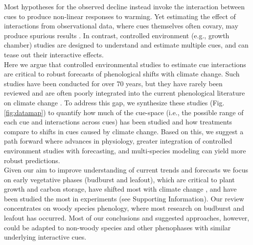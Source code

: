 \documentclass[11pt,letter]{article}
\begin{document}
Most hypotheses for the observed decline instead invoke the interaction between cues to produce non-linear responses to warming. Yet estimating the effect of interactions from observational data, where cues themselves often covary, may produce spurious results \citep{ettinger2020}. In contrast, controlled environment (e.g., growth chamber) studies are designed to understand and estimate multiple cues, and can tease out their interactive effects. \\ %

Here we argue that controlled environmental studies to estimate cue interactions are critical to robust forecasts of phenological shifts with climate change. Such studies have been conducted for over 70 years, but they have rarely been reviewed and are often poorly integrated into the current phenological literature on climate change \citep[e.g.,][]{fu2015,richardson2018}. To address this gap, we synthesize these studies (Fig. \ref{fig:datamap}) to quantify how much of the cue-space (i.e., the possible range of each cue and interactions across cues) has been studied and how treatments compare to shifts in cues caused by climate change. Based on this, we suggest a path forward where advances in physiology, greater integration of controlled environment studies with forecasting, and multi-species modeling can yield more robust predictions.\\

Given our aim to improve understanding of current trends and forecasts we focus on early vegetative phases (budburst and leafout), which are critical to plant growth and carbon storage, have shifted most with climate change \citep{Cleland:2007or}, and have been studied the most in experiments (see Supporting Information). Our review concentrates on woody species phenology, where most research on budburst and leafout has occurred. Most of our conclusions and suggested approaches, however, could be adapted to non-woody species and other phenophases with similar underlying interactive cues. 
\end{document}
